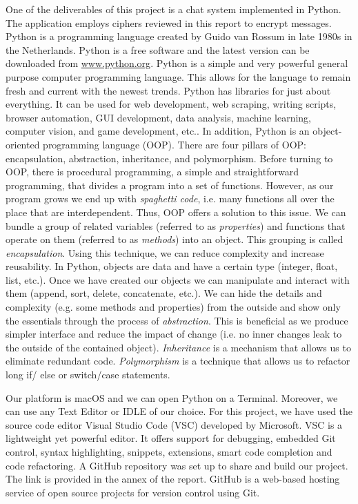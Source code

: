 One of the deliverables of this project is a chat system implemented in Python. The application employs ciphers reviewed in this report to encrypt messages. Python is a programming language created by Guido van Rossum in late 1980s in the Netherlands. Python is a free software and the latest version can be downloaded from \url{www.python.org}. Python is a simple and very powerful general purpose computer programming language. This allows for the language to remain fresh and current with the newest trends. Python has libraries for just about everything. It can be used for web development, web scraping, writing scripts, browser automation, GUI development, data analysis, machine learning, computer vision, and game development, etc.. In addition, Python is an object-oriented programming language (OOP). There are four pillars of OOP: encapsulation, abstraction, inheritance, and polymorphism. Before turning to OOP, there is procedural programming, a simple and straightforward programming, that divides a program into a set of functions. However, as our program grows we end up with \emph{spaghetti code}, i.e. many functions all over the place that are interdependent. Thus, OOP offers a solution to this issue. We can bundle a group of related variables (referred to as \emph{properties}) and functions that operate on them (referred to as \emph{methods}) into an object. This grouping is called \emph{encapsulation}. Using this technique, we can reduce complexity and increase reusability. In Python, objects are data and have a certain type (integer, float, list, etc.). Once we have created our objects we can manipulate and interact with them (append, sort, delete, concatenate, etc.). We can hide the details and complexity (e.g. some methods and properties) from the outside and show only the essentials through the process of \emph{abstraction}. This is beneficial as we produce simpler interface and reduce the impact of change (i.e. no inner changes leak to the outside of the contained object). \emph{Inheritance} is a mechanism that allows us to eliminate redundant code. \emph{Polymorphism} is a technique that allows us to refactor long if/ else or switch/case statements. 

Our platform is macOS and we can open Python on a Terminal. Moreover, we can use any Text Editor or IDLE of our choice. For this project, we have used the source code editor Visual Studio Code (VSC) developed by Microsoft. VSC is a lightweight yet powerful editor. It offers support for debugging, embedded Git control, syntax highlighting, snippets, extensions, smart code completion and code refactoring. A GitHub repository was set up to share and build our project. The link is provided in the annex of the report. GitHub is a web-based hosting service of open source projects for version control using Git. 


